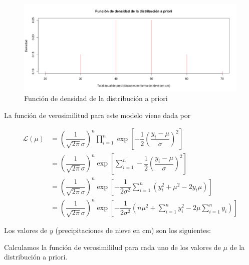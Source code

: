\documentclass[12pt,a4paper,twoside,openright,titlepage,final]{article}
\begin{document}
\begin{figure}[tbph!]
\centering
\includegraphics[width=0.9\linewidth]{./imagenes/distribucion_priori_normal}
\caption{Función de densidad de la distribución a priori}
\label{fig:distribucion_priori_normal}
\end{figure}

La función de verosimilitud para este modelo viene dada por

\begin{align*}
\mathcal{L}(\mu) & = \left(\dfrac{1}{\sqrt{2\pi} \sigma}\right)^n \prod_{i=1}^{n} \exp \left[ -\dfrac{1}{2} \left( \dfrac{y_i - \mu}{\sigma} \right)^2 \right] \\
& = \left(\dfrac{1}{\sqrt{2\pi} \sigma}\right)^n \exp \left[ \sum_{i=1}^{n} -\dfrac{1}{2} \left( \dfrac{y_i - \mu}{\sigma} \right)^2 \right] \\
& = \left(\dfrac{1}{\sqrt{2\pi} \sigma}\right)^n \exp \left[ -\dfrac{1}{2\sigma^2} \sum_{i=1}^{n} \left( y_i^2 + \mu^2 - 2y_i\mu \right) \right] \\
& = \left(\dfrac{1}{\sqrt{2\pi} \sigma}\right)^n \exp \left[ -\dfrac{1}{2\sigma^2} \left( n\mu^2 + \sum_{i=1}^{n} y_i^2 - 2\mu \sum_{i=1}^{n} y_i \right) \right]
\end{align*}

Los valores de $y$ (precipitaciones de nieve en cm) son los siguientes:

\begin{table}[htbp!]
\centering
{}
\end{table}


Calculamos la función de verosimililud para cada uno de los valores de $\mu$ de la distribución a priori.

\begin{table}[htbp!]
\centering
{}
\end{table}
\end{document}
